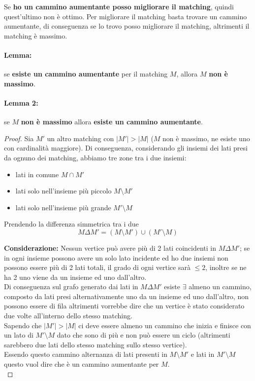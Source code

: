 \documentclass[11pt]{article}
\begin{document}
	Se \textbf{ho un cammino aumentante posso migliorare il matching}, quindi quest'ultimo non è ottimo. Per migliorare il matching basta trovare un cammino aumentante, di conseguenza se lo trovo posso migliorare il matching, altrimenti il matching è massimo.\\
	
	\paragraph{Lemma:} se \textbf{esiste un cammino aumentante} per il matching $M$, allora $M$ \textbf{non è massimo}.\\
	
	\paragraph{Lemma 2:} se $M$ \textbf{non è massimo} allora \textbf{esiste un cammino aumentante}.\\
	
	\begin{proof}
		Sia $M'$ un altro matching con $|M'| > |M|$ ($M$ non è massimo, ne esiste uno con cardinalità maggiore). Di conseguenza, considerando gli insiemi dei lati presi da ognuno dei matching, abbiamo tre zone tra i due insiemi: 
		\begin{itemize}
			\item lati in comune $M \cap M'$
			\item lati solo nell'insieme più piccolo $M \setminus M'$
			\item lati solo nell'insieme più grande $M' \setminus M$
		\end{itemize}
		
		Prendendo la differenza simmetrica tra i due
		$$ M \Delta M' = (M \setminus M') \cup (M' \setminus M)$$
		
		\textbf{Considerazione:} Nessun vertice può avere più di 2 lati coincidenti in $M \Delta M'$; se in ogni insieme possono avere un solo lato incidente ed ho due insiemi non possono essere più di 2 lati totali, il grado di ogni vertice sarà $\leq 2$, inoltre se ne ha 2 uno viene da un insieme ed uno dall'altro. \\ 
		Di conseguenza sul grafo generato dai lati in $M \Delta M'$ esiste $\exists$ almeno un cammino, composto da lati presi alternativamente uno da un insieme ed uno dall'altro, non possono essere di fila altrimenti vorrebbe dire che un vertice è stato considerato due volte all'interno dello stesso matching.\\
		Sapendo che $|M'| > |M|$ ci deve essere almeno un cammino che inizia e finisce con un lato di $M' \setminus M$ dato che sono di più e non può essere un ciclo (altrimenti sarebbero due lati dello stesso matching sullo stesso vertice). \\
		
		Essendo questo cammino alternanza di lati presenti in $M \setminus M'$ e lati in $M' \setminus M$ questo vuol dire che è un cammino aumentante per $M$.\\
	\end{proof}
	
\end{document}

